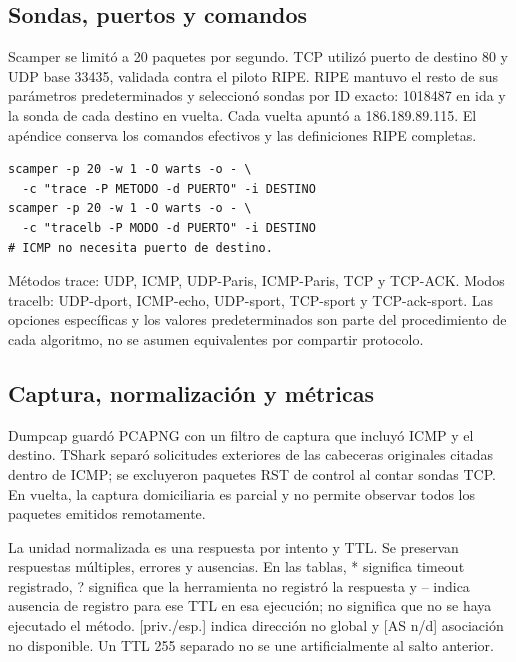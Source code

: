 \subsection{Sondas, puertos y comandos}
Scamper se limitó a 20 paquetes por segundo. TCP utilizó puerto de destino 80 y UDP base 33435, validada contra el piloto RIPE. RIPE mantuvo el resto de sus parámetros predeterminados y seleccionó sondas por ID exacto: 1018487 en ida y la sonda de cada destino en vuelta. Cada vuelta apuntó a 186.189.89.115. El apéndice conserva los comandos efectivos y las definiciones RIPE completas.

\begin{lstlisting}[caption={Forma de los comandos Scamper; los valores efectivos están en cada metadata.json.}]
scamper -p 20 -w 1 -O warts -o - \
  -c "trace -P METODO -d PUERTO" -i DESTINO
scamper -p 20 -w 1 -O warts -o - \
  -c "tracelb -P MODO -d PUERTO" -i DESTINO
# ICMP no necesita puerto de destino.
\end{lstlisting}
Métodos trace: UDP, ICMP, UDP-Paris, ICMP-Paris, TCP y TCP-ACK. Modos tracelb: UDP-dport, ICMP-echo, UDP-sport, TCP-sport y TCP-ack-sport. Las opciones específicas y los valores predeterminados son parte del procedimiento de cada algoritmo, no se asumen equivalentes por compartir protocolo.

\subsection{Captura, normalización y métricas}
Dumpcap guardó PCAPNG con un filtro de captura que incluyó ICMP y el destino. TShark separó solicitudes exteriores de las cabeceras originales citadas dentro de ICMP; se excluyeron paquetes RST de control al contar sondas TCP. En vuelta, la captura domiciliaria es parcial y no permite observar todos los paquetes emitidos remotamente.

La unidad normalizada es una respuesta por intento y TTL. Se preservan respuestas múltiples, errores y ausencias. En las tablas, * significa timeout registrado, ? significa que la herramienta no registró la respuesta y -- indica ausencia de registro para ese TTL en esa ejecución; no significa que no se haya ejecutado el método. [priv./esp.] indica dirección no global y [AS n/d] asociación no disponible. Un TTL 255 separado no se une artificialmente al salto anterior.

